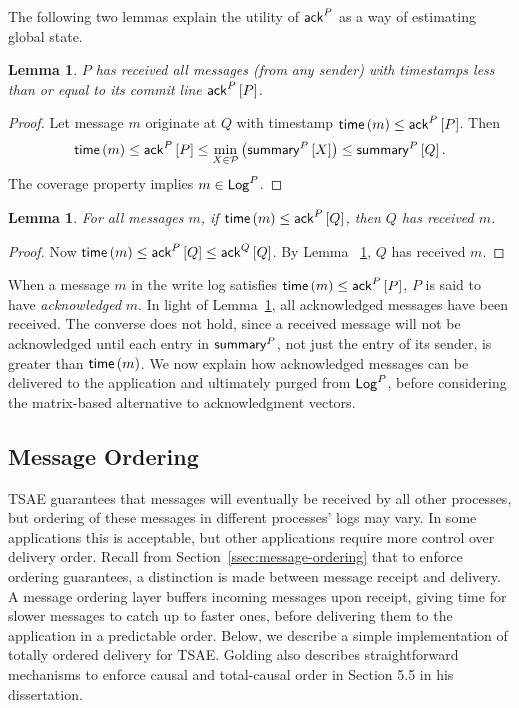\documentclass[]             %
{NASA}                       %
\newtheorem{lemma}[theorem]{Lemma}
\theoremstyle{definition}
\begin{document}
The following two lemmas explain the utility of $\mathsf{ack}^{P}$ as a way
of estimating global state.

\begin{lemma}
  \label{lem:commitline}
  $P$ has received all messages (from any sender) with timestamps less
  than or equal to its commit line $\mathsf{ack}^{P}\left[P\right]$.
\end{lemma}
\begin{proof}
  Let message $m$ originate at $Q$ with timestamp
  $\mathsf{time}\left(m\right) \leq \mathsf{ack}^{P}\left[P\right]$. Then
  \[\mathsf{time}\left(m\right) \leq \mathsf{ack}^{P}\left[P\right] \leq \min_{X \in
      \mathcal{P}}\left(\mathsf{summary}^{P}\left[X\right]\right) \leq\mathsf{summary}^{P}\left[Q\right].\] The
  coverage property implies $m \in \mathsf{Log}^{P}$.
\end{proof}

\begin{lemma}
  \label{lem:ack-vector}
  For all messages $m$, if $\mathsf{time}\left(m\right) \leq \mathsf{ack}^{P}\left[Q\right]$, then $Q$
  has received $m$.
\end{lemma}
\begin{proof}
  Now $\mathsf{time}\left(m\right) \leq \mathsf{ack}^{P}\left[Q\right] \leq \mathsf{ack}^{Q}\left[Q\right]$. By Lemma
 ~\ref{lem:commitline}, $Q$ has received $m$.
\end{proof}


When a message $m$ in the write log satisfies
$\mathsf{time}\left(m\right) \leq \mathsf{ack}^{P}\left[P\right]$, $P$ is said to have
\emph{acknowledged} $m$. In light of Lemma~\ref{lem:commitline}, all
acknowledged messages have been received. The converse does not hold,
since a received message will not be acknowledged until each entry in
$\mathsf{summary}^{P}$, not just the entry of its sender, is greater than
$\mathsf{time}\left(m\right)$. We now explain how acknowledged messages can be
delivered to the application and ultimately purged from $\mathsf{Log}^{P}$,
before considering the matrix-based alternative to acknowledgment
vectors.

\subsection{Message Ordering}
\label{ssec:tsae-message-ordering}
TSAE guarantees that messages will eventually be received by all other
processes, but ordering of these messages in different processes' logs
may vary. In some applications this is acceptable, but other
applications require more control over delivery order. Recall from
Section~\ref{ssec:message-ordering} that to enforce ordering
guarantees, a distinction is made between message receipt and
delivery. A message ordering layer buffers incoming messages upon
receipt, giving time for slower messages to catch up to faster ones,
before delivering them to the application in a predictable
order. Below, we describe a simple implementation of totally ordered
delivery for TSAE. Golding also describes straightforward mechanisms to
enforce causal and total-causal order in Section 5.5 in his
dissertation.
\end{document}
